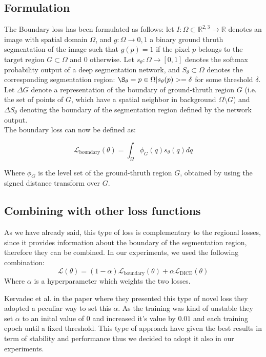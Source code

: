 \subsection{Formulation}
The Boundary loss has been formulated as follows:
let $I: \Omega \subset \mathbb{R}^{2,3} \rightarrow \mathbb{R}$ denotes an image
with spatial domain $\Omega$, and $g: \Omega \rightarrow {0,1}$ a binary ground
thruth segmentation of the image such that $g(p) = 1$ if the pixel $p$ belongs
to the target region $G \subset \Omega$ and $0$ otherwise. Let $s_\theta :
\Omega \rightarrow [0,1]$ denotes the softmax probability output of a deep
segmentation network, and $S_\theta \subset \Omega$ denotes the corresponding
segmentation region: $\S_\theta = {p \in \Omega | s_\theta(p) >= \delta}$ for
some threshold $\delta$. Let $\Delta G$ denote a representation of the boundary
of ground-thruth region $G$ (i.e. the set of points of $G$, which have a spatial
neighbor in background $\Omega \setminus G$) and $\Delta S_\theta$ denoting the
boundary of the segmentation region defined by the network output.\\
The boundary loss can now be defined as:

\begin{equation}
  \label{eq:boundaryloss}
  \mathcal{L}_{\text{boundary}}(\theta) = \int_{\Omega} \phi_G(q)s_\theta(q)dq
\end{equation}

Where $\phi_G$ is the level set of the ground-thruth region $G$, obtained by
using the signed distance transform over $G$.

\subsection{Combining with other loss functions}
As we have already said, this type of loss is complementary to the regional
losses, since it provides information about the boundary of the segmentation
region, therefore they can be combined. In our experiments, we used the
following combination:
\begin{equation}
  \label{eq:boundaryloss}
  \mathcal{L}(\theta) = (1-\alpha)\mathcal{L}_{\text{boundary}}(\theta) + \alpha\mathcal{L}_{\text{DICE}}(\theta)
\end{equation}
Where $\alpha$ is a hyperparameter which weights the two losses.

Kervadec et al. in the paper where they presented this type of novel loss they
adopted a peculiar way to set this $\alpha$. As the training was kind of
unstable they set $\alpha$ to an inital value of $0$ and increased it's value by
$0.01$ and each training epoch until a fixed threshold. This type of approach
have given the best results in term of stability and performance thus we decided
to adopt it also in our experiments.

